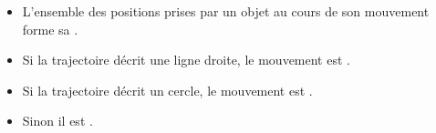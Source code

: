 \begin{mybilan}
	\begin{itemize}
		\item L'ensemble des positions prises par un objet au cours de son mouvement forme sa .
		
		\item Si la trajectoire décrit une ligne droite, le mouvement est .
		
		\item Si la trajectoire décrit un cercle, le mouvement est .
		
		\item Sinon il est .
	\end{itemize}
\end{mybilan}